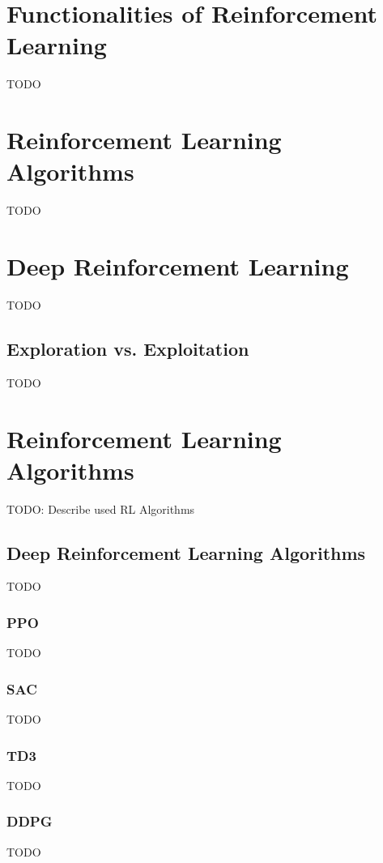 \section{Functionalities of Reinforcement Learning}\label{sec:functionalities-of-reinforcement-learning}
TODO


\section{Reinforcement Learning Algorithms}\label{sec:reinforcement-learning-algorithms2}
TODO


\section{Deep Reinforcement Learning}\label{sec:deep-reinforcement-learning}
TODO

\subsection{Exploration vs. Exploitation}\label{subsec:exploration-vs.-exploitation}
TODO


\section{Reinforcement Learning Algorithms}\label{sec:reinforcement-learning-algorithms}
TODO: Describe used RL Algorithms

\subsection{Deep Reinforcement Learning Algorithms}\label{subsec:deep-reinforcement-learning-algorithms}
TODO

\subsubsection{PPO}
TODO

\subsubsection{SAC}
TODO

\subsubsection{TD3}
TODO

\subsubsection{DDPG}
TODO


